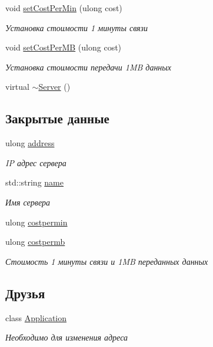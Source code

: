 \begin{DoxyCompactItemize}
void \hyperlink{class_network_service_1_1_server_a41772229229e7994706e6494f6366db8}{set\+Cost\+Per\+Min} (ulong cost)
\begin{DoxyCompactList}\small\item\em Установка стоимости 1 минуты связи \end{DoxyCompactList}\item 
void \hyperlink{class_network_service_1_1_server_a05c94527d60ec19810d7d37bd9c8aaa4}{set\+Cost\+Per\+M\+B} (ulong cost)
\begin{DoxyCompactList}\small\item\em Установка стоимости передачи 1\+M\+B данных \end{DoxyCompactList}\item 
virtual \hyperlink{class_network_service_1_1_server_a4b3aa2579cb1c8cd1d069582c14d0fa6}{$\sim$\+Server} ()
\end{DoxyCompactItemize}
\subsection*{Закрытые данные}
\begin{DoxyCompactItemize}
\item 
ulong \hyperlink{class_network_service_1_1_server_a09382556ff4ab5abc7a79a333ad92329}{address}
\begin{DoxyCompactList}\small\item\em I\+P адрес сервера \end{DoxyCompactList}\item 
std\+::string \hyperlink{class_network_service_1_1_server_aaab7735b4b5809169ecb92fa66f0bca7}{name}
\begin{DoxyCompactList}\small\item\em Имя сервера \end{DoxyCompactList}\item 
ulong \hyperlink{class_network_service_1_1_server_a8b24807f5ca15d5348734cf5f4fe96ff}{costpermin}
\item 
ulong \hyperlink{class_network_service_1_1_server_a44f0b3aacbbbbbcf0216974c23d1baf1}{costpermb}
\begin{DoxyCompactList}\small\item\em Стоимость 1 минуты связи и 1\+M\+B переданных данных \end{DoxyCompactList}\end{DoxyCompactItemize}
\subsection*{Друзья}
\begin{DoxyCompactItemize}
\item 
class \hyperlink{class_network_service_1_1_server_a23f25bcc02a0e94c2f5a4188496b04d0}{Application}
\begin{DoxyCompactList}\small\item\em Необходимо для изменения адреса \end{DoxyCompactList}\end{DoxyCompactItemize}
